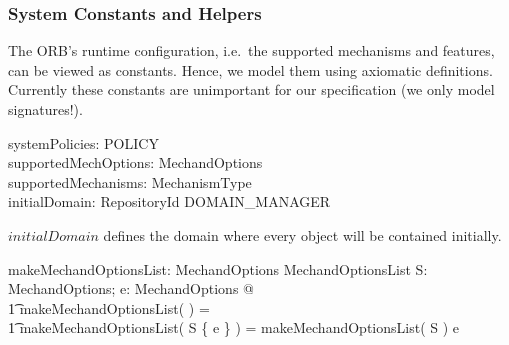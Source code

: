 \subsubsection{System Constants and Helpers}
The ORB's runtime configuration, i.e.\ the supported mechanisms and features,
can be viewed as constants.  Hence, we model them using axiomatic definitions.
Currently these constants are unimportant for our specification (we only model
signatures!).
  
\begin{axdef}
  systemPolicies: \power POLICY \\
  supportedMechOptions: \power MechandOptions \\
  supportedMechanisms: \power MechanismType \\
  initialDomain: RepositoryId \fun DOMAIN\_MANAGER \\
\end{axdef}
$initialDomain$ defines the domain where every object will be contained
initially.
\begin{axdef}
  makeMechandOptionsList: \power MechandOptions \fun MechandOptionsList
  \where
  \forall S: \power MechandOptions; e: MechandOptions @ \\
  \t1 makeMechandOptionsList( \emptyset ) = \langle \rangle \land \\
  \t1 makeMechandOptionsList( S \cup \{ e \} ) = makeMechandOptionsList( S ) \cat
  \langle e \rangle \\ 
\end{axdef}


